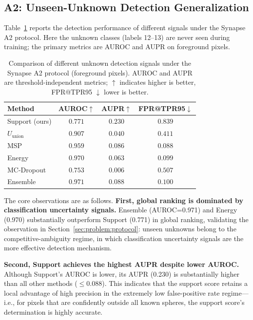 \documentclass[3p,twocolumn,authoryear]{elsarticle}
\begin{document}
\subsection{A2: Unseen-Unknown Detection Generalization}\label{sec:exp:a2}

Table~\ref{tab:a2_main} reports the detection performance of different signals under
the Synapse A2 protocol.
Here the unknown classes (labels 12--13) are never seen during training;
the primary metrics are AUROC and AUPR on foreground pixels.

\begin{table}[t]
\centering
\caption{Comparison of different unknown detection signals under the Synapse A2 protocol
(foreground pixels). AUROC and AUPR are threshold-independent metrics;
$\uparrow$ indicates higher is better, FPR@TPR95 $\downarrow$ lower is better.}\label{tab:a2_main}
\begin{tabular}{lccc}
\toprule
Method & AUROC$\uparrow$ & AUPR$\uparrow$ & FPR@TPR95$\downarrow$ \\
\midrule
Support (ours) & $0.771$ & $\mathbf{0.230}$ & $0.839$ \\
$U_{\text{union}}$     & $0.907$ & $0.040$ & $0.411$ \\
MSP                    & $0.959$ & $0.086$ & $\mathbf{0.088}$ \\
Energy                 & $0.970$ & $0.063$ & $0.099$ \\
MC-Dropout             & $0.753$ & $0.006$ & $0.507$ \\
Ensemble               & $\mathbf{0.971}$ & $0.088$ & $0.100$ \\
\bottomrule
\end{tabular}
\end{table}

The core observations are as follows.
\textbf{First, global ranking is dominated by classification uncertainty signals.}
Ensemble (AUROC=0.971) and Energy (0.970) substantially outperform Support (0.771)
in global ranking, validating the observation in Section~\ref{sec:problem:protocol}:
unseen unknowns belong to the competitive-ambiguity regime, in which classification
uncertainty signals are the more effective detection mechanism.

\textbf{Second, Support achieves the highest AUPR despite lower AUROC.}
Although Support's AUROC is lower, its AUPR (0.230) is substantially higher than all
other methods ($\leq$0.088).
This indicates that the support score retains a local advantage of high precision in
the extremely low false-positive rate regime---i.e., for pixels that are confidently
outside all known spheres, the support score's determination is highly accurate.
\end{document}
